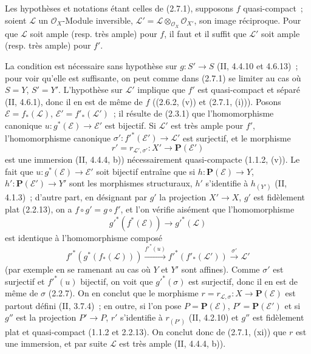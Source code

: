 \begin{corollary}[2.7.2]
\label{IV.2.7.2-fr}
Les hypothèses et notations étant celles de (2.7.1), supposons $f$
quasi-compact~; soient $\mathcal L$ un $\mathcal O_X$-Module inversible,
$\mathcal L'=\mathcal L\otimes_{\mathcal O_X}\mathcal O_{X'}$, son image
réciproque. Pour que $\mathcal L$ soit ample (resp. très ample) pour $f$, il
faut et il suffit que $\mathcal L'$ soit ample (resp. très ample) pour $f'$.
\end{corollary}

La condition est nécessaire sans hypothèse sur $g:S'\to S$ (II, 4.4.10 et
4.6.13)~; pour voir qu'elle est suffisante, on peut comme dans (2.7.1) se
limiter au cas où $S=Y$, $S'=Y'$. L'hypothèse sur $\mathcal L'$ implique que
$f'$ est quasi-compact et séparé (II, 4.6.1), donc il en est de même de $f$
((2.6.2, (v)) et (2.7.1, (i))). Posons
$\mathcal E=f_*(\mathcal L)$, $\mathcal E'=f'_*(\mathcal L')$~; il résulte
de (2.3.1) que l'homomorphisme canonique
$u:g^*(\mathcal E)\to\mathcal E'$ est bijectif. Si $\mathcal L'$ est très
ample pour $f'$, l'homomorphisme canonique
$\sigma':f'^*(\mathcal E')\to\mathcal L'$ est surjectif, et le morphisme
\[
r'=r_{\mathcal L',\sigma'}:X'\longrightarrow\mathbf P(\mathcal E')
\]
est une immersion (II, 4.4.4, b)) nécessairement quasi-compacte (1.1.2,
(v)). Le fait que $u:g^*(\mathcal E)\to\mathcal E'$ soit bijectif entraîne
que si $h:\mathbf P(\mathcal E)\to Y$, $h':\mathbf P(\mathcal E')\to Y'$
sont les morphismes structuraux, $h'$ s'identifie à $h_{(Y')}$ (II, 4.1.3)~;
d'autre part, en désignant par $g'$ la projection $X'\to X$, $g'$ est
fidèlement plat (2.2.13), on a $f\circ g'=g\circ f'$, et l'on vérifie
aisément que l'homomorphisme
\[
g'^*(f^*(\mathcal E))\longrightarrow g'^*(\mathcal L)
\]
est identique à l'homomorphisme composé
\[
f'^*(g^*(f_*(\mathcal L)))\xrightarrow{f'^*(u)}
f'^*(f'_*(\mathcal L'))\xrightarrow{\sigma'}\mathcal L'
\]
(par exemple en se ramenant au cas où $Y$ et $Y'$ sont affines). Comme
$\sigma'$ est surjectif et $f'^*(u)$ bijectif, on voit que
$g'^*(\sigma)$ est surjectif, donc il en est de même de $\sigma$ (2.2.7).
On en conclut que le morphisme
$r=r_{\mathcal L,\sigma}:X\to\mathbf P(\mathcal E)$ est partout défini
(II, 3.7.4)~; en outre, si l'on pose $P=\mathbf P(\mathcal E)$,
$P'=\mathbf P(\mathcal E')$ et si $g''$ est la projection $P'\to P$, $r'$
s'identifie à $r_{(P')}$ (II, 4.2.10) et $g''$ est fidèlement plat et
quasi-compact (1.1.2 et 2.2.13). On conclut donc de (2.7.1, (xi)) que $r$ est
une immersion, et par suite $\mathcal L$ est très ample (II, 4.4.4, b)).

